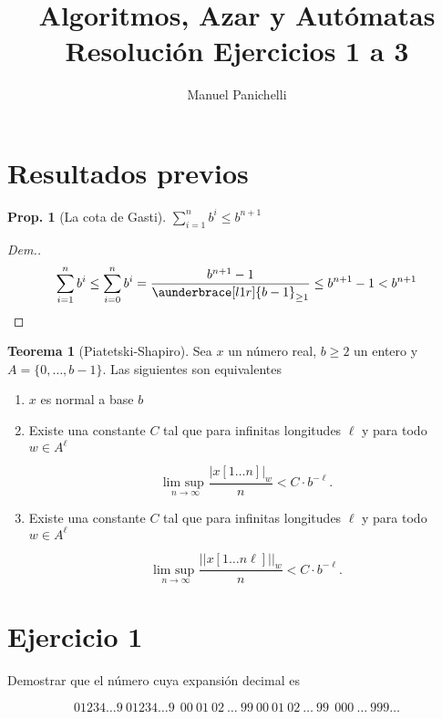 \documentclass{article}
\author{Manuel Panichelli}
\title{Algoritmos, Azar y Autómatas\\Resolución Ejercicios 1 a 3}
\theoremstyle{definition} %
\newtheorem{theorem}{Teorema}
\newtheorem{proposition}{Prop.}
\begin{document}
\maketitle

\section*{Resultados previos}

\begin{proposition}[La cota de Gasti]\label{prop:cota-gasti}
    $\sum_{i = 1}^{n} b^i \leq b^{n+1}$
\end{proposition}
\begin{proof}[Dem.]
    \[
        \sum_{i = 1}^{n} b^i
            \leq \sum_{i = 0}^{n} b^i
            = \frac
                {b^{n+1} - 1}
                {\aunderbrace[l1r]{b - 1}_{\geq 1}}
            \leq b^{n+1} - 1 < b^{n+1}
    \]
\end{proof}

\begin{theorem}[Piatetski-Shapiro]\label{teo:piatetski-shapiro}
    Sea $x$ un número real, $b \geq 2$ un entero y $A = \{0, \dots, b - 1\}$.
    Las siguientes son equivalentes
    \begin{enumerate}
        \item $x$ es normal a base $b$
        \item Existe una constante $C$ tal que para infinitas longitudes $\ell$ y
        para todo $w \in A^\ell$

        $$
            \underset{n \to \infty}{\text{lim sup }}
            \frac{|x[1\dots n]|_w}{n} < C \cdot b^{-\ell}.
        $$
        \item Existe una constante $C$ tal que para infinitas longitudes $\ell$ y
        para todo $w \in A^\ell$

        $$
            \underset{n \to \infty}{\text{lim sup }}
            \frac{||x[1\dots n\ell]||_w}{n} < C \cdot b^{-\ell}.
        $$ 
    \end{enumerate}
\end{theorem}

\section*{Ejercicio 1}

Demostrar que el número cuya expansión decimal es

\[
    01234\dots9\ 01234\dots9\ \
    00\ 01\ 02\ \dots\ 99\ 00\ 01\ 02\ \dots\ 99 \ \
    000\ \dots\ 999\dots
\]
\end{document}
